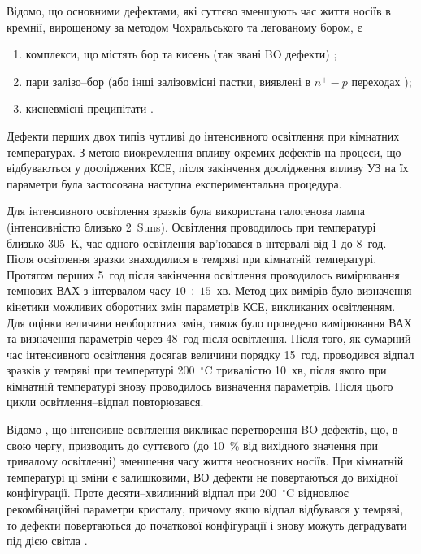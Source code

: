 Відомо, що основними дефектами, які суттєво зменшують час життя носіїв в кремнії, вирощеному
за методом Чохральського та легованому бором, є
\begin{enumerate}[label=\asbuk*),leftmargin=0em,itemindent=1.5em]
\item  комплекси, що містять бор та кисень (так звані BO дефекти) \cite{LIDRev,LIDRev2};
\item пари залізо--бор \cite{MurphyJAP2011,FeB:Vahanissi,FeB:Schmidt} (або інші залізовмісні пастки, виявлені в $n^+-p$ переходах \cite{TeimurazPSS,TeimurazJAP});
\item кисневмісні преципітати \cite{MurphySC2014,Oxide_Schon,MurphyJAP2011,MurphyJAP2012,Oxide:Chen,Oxide:Porrini}.
\end{enumerate}
Дефекти перших двох типів чутливі до інтенсивного освітлення при кімнатних температурах.
З метою виокремлення впливу окремих дефектів на процеси, що відбуваються у досліджених КСЕ,
після закінчення дослідження впливу УЗ на їх параметри
була застосована наступна експериментальна процедура.

Для інтенсивного освітлення зразків була використана галогенова лампа (інтенсивністю близько 2~Suns).
Освітлення проводилось при температурі близько 305~K,
час одного освітлення вар'ювався в інтервалі від 1 до 8~год.
Після освітлення зразки знаходилися в темряві при кімнатній температурі.
Протягом перших 5~год після закінчення освітлення проводилось вимірювання темнових ВАХ з інтервалом часу $10\div15$~хв.
Метод цих вимірів було визначення кінетики можливих оборотних змін параметрів КСЕ, викликаних освітленням.
Для оцінки величини необоротних змін, також було проведено вимірювання ВАХ та визначення параметрів через 48~год
після освітлення.
Після того, як сумарний час інтенсивного освітлення досягав величини порядку 15~год,
проводився відпал зразків у темряві при температурі 200~$^\circ$C тривалістю 10~хв,
після якого при кімнатній температурі знову проводилось визначення параметрів.
Після цього цикли освітлення--відпал повторювався.

Відомо \cite{LIDRev,LIDRev2}, що інтенсивне освітлення викликає перетворення BO дефектів, що, в свою
чергу, призводить до суттєвого (до 10~\% від вихідного значення при тривалому освітленні) зменшення часу життя неосновних носіїв.
При кімнатній температурі ці зміни є залишковими, ВО дефекти не повертаються до вихідної конфігурації.
Проте десяти--хвилинний відпал при 200~$^\circ$C відновлює рекомбінаційні параметри кристалу, причому
якщо відпал відбувався у темряві, то дефекти повертаються до початкової конфігурації і знову можуть деградувати під
дією світла \cite{BO:Halam2016,LIDRev2,Kim}.

